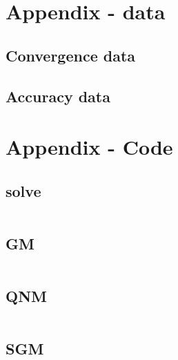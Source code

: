 \section{Appendix - data}
\label{sec:appendix}

\subsection{Convergence data}%
\label{sec:convergence_data}


\subsection{Accuracy data}%
\label{sec:appendix_accuracy}


\pagebreak
\section{Appendix - Code}



\subsection{solve}
\inputminted{matlab}{../src/uo_nn_solve.m}
\subsection{GM}
\inputminted{matlab}{../src/uo_nn_GM.m}
\subsection{QNM}
\inputminted{matlab}{../src/uo_nn_QNM.m}
\subsection{SGM}
\inputminted{matlab}{../src/uo_nn_SGM.m}
